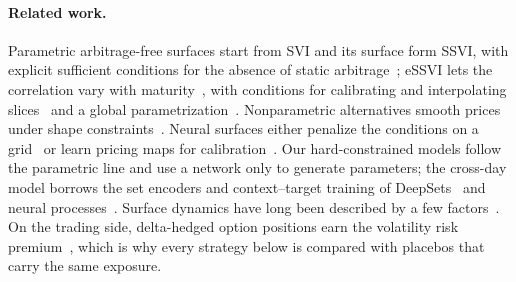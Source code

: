 \paragraph{Related work.} Parametric arbitrage-free surfaces start from SVI and its surface form
SSVI, with explicit sufficient conditions for the absence of static arbitrage~\citep{gatheral2014};
eSSVI lets the correlation vary with maturity~\citep{hendriks2019}, with conditions for calibrating
and interpolating slices~\citep{corbetta2019} and a global parametrization~\citep{mingone2022}.
Nonparametric alternatives smooth prices under shape constraints~\citep{fengler2009}. Neural surfaces
either penalize the conditions on a grid~\citep{ackerer2020} or learn pricing maps for
calibration~\citep{horvath2021}. Our hard-constrained models follow the parametric line and use a
network only to generate parameters; the cross-day model borrows the set encoders and
context--target training of DeepSets~\citep{zaheer2017} and neural processes~\citep{garnelo2018}.
Surface dynamics have long been described by a few factors~\citep{cont2002}. On the trading side,
delta-hedged option positions earn the volatility risk premium~\citep{bakshi2003,carr2009}, which
is why every strategy below is compared with placebos that carry the same exposure.
